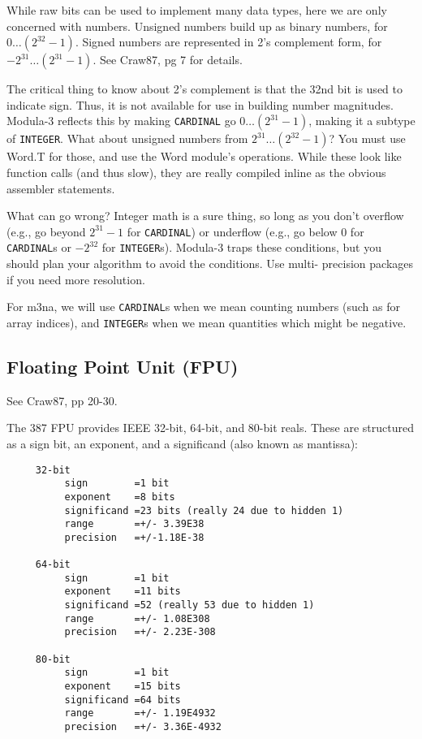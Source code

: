 While raw bits can be used to implement many data types,
here we are only concerned with numbers.  Unsigned numbers
build up as binary numbers, for $0 \dots (2^{32} - 1)$.  Signed numbers
are represented in 2's complement form, for $-2^{31} \dots (2^{31} -
1)$.  See Craw87, pg 7 for details.

The critical thing to know about 2's complement is that the
32nd bit is used to indicate sign.  Thus, it is not
available for use in building number magnitudes.  Modula-3
reflects this by making {\tt CARDINAL}  go $0 \dots (2^{31} -1)$, 
making it a subtype of {\tt INTEGER}.  What about unsigned numbers from
$2^{31} \dots (2^{32}-1)$?  You must use Word.T for those, and use the
Word module's operations.  While these look like function
calls (and thus slow), they are really compiled inline as
the obvious assembler statements.

What can go wrong?  Integer math is a sure thing, so long as
you don't overflow (e.g., go beyond $2^{31}-1$ for {\tt CARDINAL}) or
underflow (e.g., go below $0$ for {\tt CARDINAL}s or $-2^{32}$ for
{\tt INTEGER}s).  Modula-3 traps these conditions, but you should
plan your algorithm to avoid the conditions.  Use multi-
precision packages if you need more resolution.

For m3na, we will use {\tt CARDINAL}s when we mean counting
numbers (such as for array indices), and {\tt INTEGER}s when we
mean quantities which might be negative.

\subsection{Floating Point Unit (FPU)}
See Craw87, pp 20-30.

The 387 FPU provides IEEE 32-bit, 64-bit, and 80-bit reals.
These are structured as a sign bit, an exponent, and a
significand (also known as mantissa):
\begin{verbatim}
     32-bit
          sign        =1 bit
          exponent    =8 bits
          significand =23 bits (really 24 due to hidden 1)
          range       =+/- 3.39E38
          precision   =+/-1.18E-38
     
     64-bit
          sign        =1 bit
          exponent    =11 bits
          significand =52 (really 53 due to hidden 1)
          range       =+/- 1.08E308
          precision   =+/- 2.23E-308
     
     80-bit
          sign        =1 bit
          exponent    =15 bits
          significand =64 bits
          range       =+/- 1.19E4932
          precision   =+/- 3.36E-4932
\end{verbatim}

